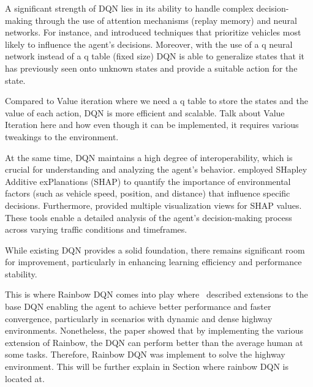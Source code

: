 \documentclass{article}
\begin{document}
A significant strength of DQN lies in its ability to handle complex decision-making through the use of attention mechanisms (replay memory) and neural networks.
For instance, \citep{leurent_social_2019} and \citep{bellotti_designing_2023} introduced techniques that prioritize vehicles most likely to influence the agent’s decisions.  
Moreover, with the use of a q neural network instead of a q table (fixed size) DQN is able to generalize states that it has previously seen onto unknown states and provide a suitable action for the state.

Compared to Value iteration where we need a q table to store the states and the value of each action, DQN is more efficient and scalable.
Talk about Value Iteration here and how even though it can be implemented, it requires various tweakings to the environment.

At the same time, DQN maintains a high degree of interoperability, which is crucial for understanding and analyzing the agent's behavior. 
\citep{bellotti_explaining_2023} employed SHapley Additive exPlanations (SHAP) to quantify the importance of environmental factors (such as vehicle speed, position, and distance) that influence specific decisions. 
Furthermore, \citep{bellotti_designing_2023} provided multiple visualization views for SHAP values. 
These tools enable a detailed analysis of the agent’s decision-making process across varying traffic conditions and timeframes.

While existing DQN provides a solid foundation, there remains significant room for improvement, particularly in enhancing learning efficiency and performance stability. 


This is where Rainbow DQN comes into play where~\cite{hessel_rainbow_2017} described extensions to the base DQN enabling the agent to achieve better performance and faster convergence, particularly in scenarios with dynamic and dense highway environments.
Nonetheless, the paper showed that by implementing the various extension of Rainbow, the DQN can perform better than the average human at some tasks.
Therefore, Rainbow DQN was implement to solve the highway environment.
This will be further explain in Section where rainbow DQN is located at.

\end{document}
